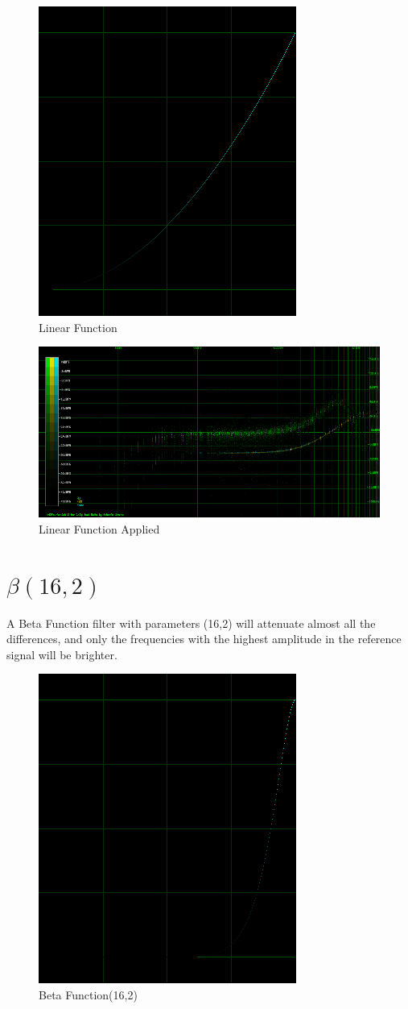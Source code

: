 \documentclass[10pt,a4paper]{report}
\begin{document}
\begin{appendices}
\begin{figure}[H]
	\centering
	\includegraphics[width=0.4\linewidth]{images/colorfilter/BetaFunctionPlot_4.png}
	\caption[Linear]{Linear Function}
	\label{fig:betafunctionplot4}
\end{figure}

\begin{figure}[H]
	\centering
	\includegraphics[width=1\linewidth]{images/colorfilter/BetaFunctionPlot_4_Data.png}
	\caption[Linear Applied]{Linear Function Applied}
	\label{fig:betafunctionplot4data}
\end{figure}

\newpage
\section{$\beta(16,2)$} 

A Beta Function filter with parameters (16,2) will attenuate almost all the differences, and only the frequencies with the highest amplitude in the reference signal will be brighter.

\begin{figure}[H]
	\centering
	\includegraphics[width=0.4\linewidth]{images/colorfilter/BetaFunctionPlot_5.png}
	\caption[Beta Function(16,2)]{Beta Function(16,2)}
	\label{fig:betafunctionplot5}
\end{figure}


\end{appendices}
\end{document}
